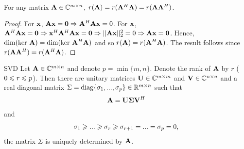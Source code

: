 \begin{proposition}{}{}
    For any matrix $\bold{A}\in \mathbb{C}^{m\times n}$, $r(\bold{A})=r(\bold{A}^H\bold{A})=r(\bold{A}\bold{A}^H)$.
\end{proposition}
\begin{proof}
    For $\bold{x}$, $\bold{Ax}=\bold{0}\Rightarrow \bold{A}^H\bold{Ax}=0$.
    For $\bold{x}$, $\bold{A}^H\bold{Ax}=\bold{0}\Rightarrow \bold{x}^H\bold{A}^H\bold{Ax}=\bold{0}\Rightarrow ||\bold{Ax}||_2^2=0\Rightarrow \bold{Ax}=\bold{0}$.
    Hence, $\text{dim(ker } \bold{A})=\text{dim(ker } \bold{A}^H\bold{A})$ and so $r(\bold{A})=r(\bold{A}^H\bold{A})$. 
    The result follows since $r(\bold{A}\bold{A}^H)=r(\bold{A}^H\bold{A})$.
\end{proof}

\begin{theorem}{}{SVD}
    Let $\bold{A}\in \mathbb{C}^{m\times n}$ and denote $p=\min\{m,n\}$.
    Denote the rank of $\bold{A}$ by $r$ ($0\leqslant r\leqslant p$).
    Then there are unitary matrices $\bold{U}\in \mathbb{C}^{m\times m}$ and $\bold{V}\in \mathbb{C}^{n\times n}$
    and a real diagonal matrix $\Sigma =\text{diag} \{\sigma_1,...,\sigma_p\}\in \mathbb{R}^{m\times n}$ such that 
    \begin{align*}
        \bold{A}=\bold{U}\bold{\Sigma}\bold{V}^H
    \end{align*}
    and 
    \begin{align*}
        \sigma_1\geqslant ...\geqslant \sigma_r\geqslant \sigma_{r+1}=...=\sigma_p=0,
    \end{align*}
    the matrix $\Sigma$ is uniquely determined by $\bold{A}$.
\end{theorem}

